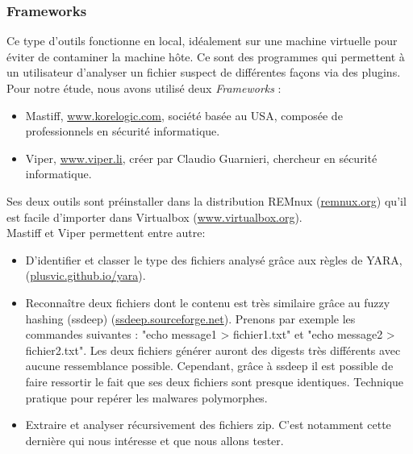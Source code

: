\documentclass[smallextended]{svjour3}       %
\begin{document}
\subsubsection{Frameworks}
Ce type d'outils fonctionne en local, idéalement sur une machine virtuelle pour éviter de contaminer la machine hôte. Ce sont des programmes qui permettent à un utilisateur d'analyser un fichier suspect de différentes façons via des plugins. Pour notre étude, nous avons utilisé deux \textit{Frameworks} : 
\label{2.2.2frameworks}
\begin{itemize}
\item Mastiff, \url{www.korelogic.com}, société basée au USA, composée de professionnels en sécurité informatique.
\item Viper, \url{www.viper.li}, créer par Claudio Guarnieri, chercheur en sécurité informatique.
\end{itemize}
Ses deux outils sont préinstaller dans la distribution REMnux (\url{remnux.org}) qu'il est facile d'importer dans Virtualbox (\url{www.virtualbox.org}).\\
Mastiff et Viper permettent entre autre:
\begin{itemize}
\item D’identifier et classer le type des fichiers analysé grâce aux règles de YARA, (\url{plusvic.github.io/yara}).
\item Reconnaître deux fichiers dont le contenu est très similaire grâce au fuzzy hashing (ssdeep) (\url{ssdeep.sourceforge.net}). Prenons par exemple les commandes suivantes : "echo message1 > fichier1.txt" et "echo message2 > fichier2.txt". Les deux fichiers générer auront des digests très différents avec aucune ressemblance possible. Cependant, grâce à ssdeep il est possible de faire ressortir le fait que ses deux fichiers sont presque identiques. Technique pratique pour repérer les malwares polymorphes.
\item Extraire et analyser récursivement des fichiers zip. C'est notamment cette dernière qui nous intéresse et que nous allons tester.
\end{itemize}
\end{document}
